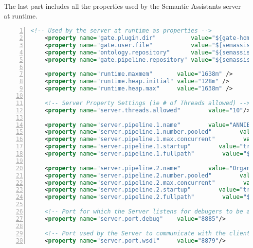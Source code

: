 The last part includes all the properties used by the Semantic Assistants server at runtime.
\begin{lstlisting}[language=XML,numbers=left,xleftmargin=8mm,columns=flexible]
    <!-- Used by the server at runtime as properties -->
    <property name="gate.plugin.dir"          value="${gate-home}/plugins/"/>
    <property name="gate.user.file"           value="${semassist.home}/Server/gate-home/user-gate.xml" />
    <property name="ontology.repository"      value="${semassist.home}/Resources/ont-repository/" />
    <property name="gate.pipeline.repository" value="${semassist.home}/Resources/GatePipelines/" />

    <property name="runtime.maxmem"       value="1638m" />
    <property name="runtime.heap.initial" value="128m" />
    <property name="runtime.heap.max"     value="1638m" />
    
    <!-- Server Property Settings (ie # of Threads allowed) -->
    <property name="server.threads.allowed"        value="10"/>

    <property name="server.pipeline.1.name"        value="ANNIE"/>
    <property name="server.pipeline.1.number.pooled"        value="1"/>
    <property name="server.pipeline.1.max.concurrent"        value="1"/>
    <property name="server.pipeline.1.startup"        value="true"/>
    <property name="server.pipeline.1.fullpath"        value="${gate.pipeline.repository}/Annie/"/>

    <property name="server.pipeline.2.name"        value="Organism"/>
    <property name="server.pipeline.2.number.pooled"        value="1"/>
    <property name="server.pipeline.2.max.concurrent"        value="1"/>
    <property name="server.pipeline.2.startup"        value="true"/>
    <property name="server.pipeline.2.fullpath"        value="${gate.pipeline.repository}/OrganismTagger/"/>

    <!-- Port for which the Server listens for debugers to be attached -->
    <property name="server.port.debug"    value="8885"/>
    
    <!-- Port used by the Server to communicate with the clients through wsdl-->
    <property name="server.port.wsdl"     value="8879"/>
\end{lstlisting}
